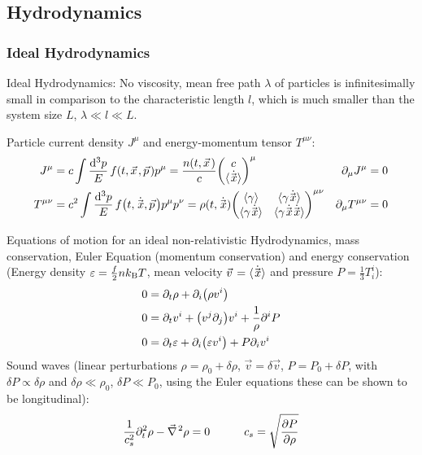 	\subsection{Hydrodynamics}
		\subsubsection{Ideal Hydrodynamics}
			Ideal Hydrodynamics: No viscosity, mean free path $\lambda$ of particles is infinitesimally small in comparison to the characteristic length $l$, which is much smaller than the system size $L$, \ie $\lambda \ll l \ll L$.

			\noindent
			Particle current density $J^\mu$ and energy-momentum tensor $T^{\mu\nu}$:
			\begin{align}
				J^{\mu} &= c \int \frac{\dd[3] p}{E}\, f\qty(t, \vec{x}, \vec{p}) p^{\mu} = \frac{n(t, \vec{x})}{c} \mqty(c\\\avg{\dot{\vec{x}}})^\mu
				&
				\partial_\mu J^{\mu} &= 0 \\
				T^{\mu\nu} &= c^2 \int \frac{\dd[3] p}{E}\, f\qty(t, \dot{\vec{x}}, \vec{p}) p^{\mu} p^{\nu} =\rho(t, \dot{\vec{x}})\mqty(\avg{\gamma} & \avg{\gamma \dot{\vec{x}}} \\ \avg{\gamma \dot{\vec{x}}} & \avg{\gamma\dot{\vec{x}}\dot{\vec{x}}})^{\mu\nu}
				&
				\partial_\mu T^{\mu\nu} &= 0
			\end{align}

			\noindent
			Equations of motion for an ideal non-relativistic Hydrodynamics, \ie mass conservation, Euler Equation (momentum conservation) and energy conservation (Energy density $\varepsilon=\frac{f}{2} n k_{\text{B}} T$, mean velocity $\vec{v}=\avg{\dot{\vec{x}}}$ and pressure $P = \frac{1}{3} T^{i}_i$):
			\begin{align}
				0 &= \partial_t \rho + \partial_i \qty(\rho v^i) \\
				0 &= \partial_t v^i + \qty(v^j \partial_j) v^i + \frac{1}{\rho} \partial^i P \\
				0 &= \partial_t \varepsilon + \partial_i \qty(\varepsilon v^i) + P \partial_i v^i
			\end{align}
			\noindent
			Sound waves (linear perturbations $\rho = \rho_0 + \delta \rho$, $\vec{v} = \delta \vec{v}$, $P = P_0 + \delta P$, with $\delta P \propto \delta \rho$ and $\delta \rho \ll \rho_0$, $\delta P \ll P_0$, using the Euler equations these can be shown to be longitudinal):
			\begin{equation}
				\frac{1}{c_s^2} \partial_t^2 \rho - \Nabla^2 \rho = 0 \hsp c_s = \sqrt{\frac{\partial P}{\partial \rho}}
			\end{equation}

